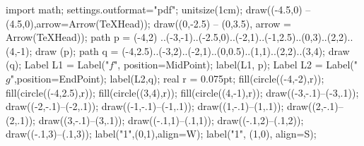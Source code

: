 import math;
settings.outformat="pdf";
unitsize(1cm);
draw((-4.5,0) -- (4.5,0),arrow=Arrow(TeXHead));
draw((0,-2.5) -- (0,3.5), arrow = Arrow(TeXHead));
path p = (-4,2) ..(-3,-1)..(-2.5,0)..(-2,1)..(-1,2.5)..(0,3)..(2,2)..(4,-1);
draw (p);
path q = (-4,2.5)..(-3,2)..(-2,1)..(0,0.5)..(1,1)..(2,2)..(3,4);
draw (q);
Label L1 = Label("$f$", position=MidPoint);
label(L1, p);
Label L2 = Label("$g$",position=EndPoint);
label(L2,q);
real r = 0.075pt;
fill(circle((-4,-2),r));
fill(circle((-4,2.5),r));
fill(circle((3,4),r));
fill(circle((4,-1),r));
draw((-3,-.1)--(-3,.1));
draw((-2,-.1)--(-2,.1));
draw((-1,-.1)--(-1,.1));
draw((1,-.1)--(1,.1));
draw((2,-.1)--(2,.1));
draw((3,-.1)--(3,.1));
draw((-.1,1)--(.1,1));
draw((-.1,2)--(.1,2));
draw((-.1,3)--(.1,3));
label("1",(0,1),align=W);
label("1", (1,0), align=S);